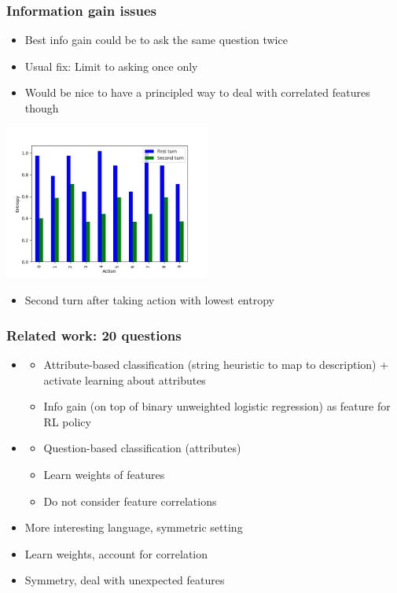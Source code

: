 \documentclass{beamer}
\begin{document}
\begin{frame}
\frametitle{Information gain issues}
\begin{itemize}
\item Best info gain could be to ask the same question twice
\item Usual fix: Limit to asking once only
\item Would be nice to have a principled way to deal with correlated
    features though
\end{itemize}
\centering
\includegraphics[height=2in]{src/entropy.png}
\begin{itemize}
\item Second turn after taking action with lowest entropy
\end{itemize}
\end{frame}

\begin{frame}
\frametitle{Related work: 20 questions}
\begin{itemize}
\item \citet{padmakumar}
    \begin{itemize}
    \item Attribute-based classification (string heuristic to map to description)
        + activate learning about attributes
    \item Info gain (on top of binary unweighted logistic regression) as feature for
        RL policy
    \end{itemize}
\item \citet{yu}
    \begin{itemize}
    \item Question-based classification (attributes)
    \item Learn weights of features
    \item Do not consider feature correlations
    \end{itemize}
\item More interesting language, symmetric setting
\item Learn weights, account for correlation
\item Symmetry, deal with unexpected features
\end{itemize}
\end{frame}
\end{document}
